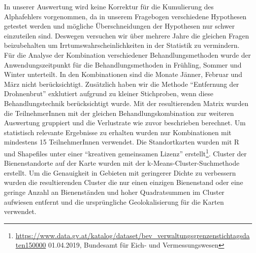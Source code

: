 \newline
In unserer Auswertung wird keine Korrektur für die Kumulierung des Alphafehlers vorgenommen, da in unserem Fragebogen verschiedene Hypothesen getestet werden und mögliche Überschneidungen der Hypothesen nur schwer einzuteilen sind. Deswegen versuchen wir über mehrere Jahre die gleichen Fragen beizubehalten um Irrtumswahrscheinlichkeiten in der Statistik zu vermindern.
\newline
Für die Analyse der Kombination verschiedener Behandlungsmethoden wurde der Anwendungszeitpunkt für die Behandlungsmethoden in Frühling, Sommer und Winter unterteilt. In den Kombinationen sind die Monate Jänner, Februar und März nicht berücksichtigt. Zusätzlich haben wir die Methode \enquote{Entfernung der Drohnenbrut} exklutiert aufgrund zu kleiner Stichproben, wenn diese Behandlungstechnik berücksichtigt wurde. 
Mit der resultierenden Matrix wurden die TeilnehmerInnen mit der gleichen Behandlungskombination zur weiteren Auswertung gruppiert und die Verlustrate wie zuvor beschrieben berechnet. Um statistisch relevante Ergebnisse zu erhalten wurden nur Kombinationen mit mindestens 15 TeilnehmerInnen verwendet.
\newline
Die Standortkarten wurden mit R \citep{rcoreteam2020} und Shapefiles unter einer \enquote{kreativen gemeinsamen Lizenz} erstellt\footnote{\url{https://www.data.gv.at/katalog/dataset/bev_verwaltungsgrenzenstichtagsdaten150000} 01.04.2019, Bundesamt für Eich- und Vermessungswesen}. Cluster der Bienenstandorte auf der Karte wurden mit der k-Means-Cluster-Suchmethode erstellt. Um die Genauigkeit in Gebieten mit geringerer Dichte zu verbessern wurden die resultierenden Cluster die nur einen einzigen Bienenstand oder eine geringe Anzahl an Bienenständen und hoher Quadratsummen im Cluster aufwiesen entfernt und die ursprüngliche Geolokalisierung für die Karten verwendet.
